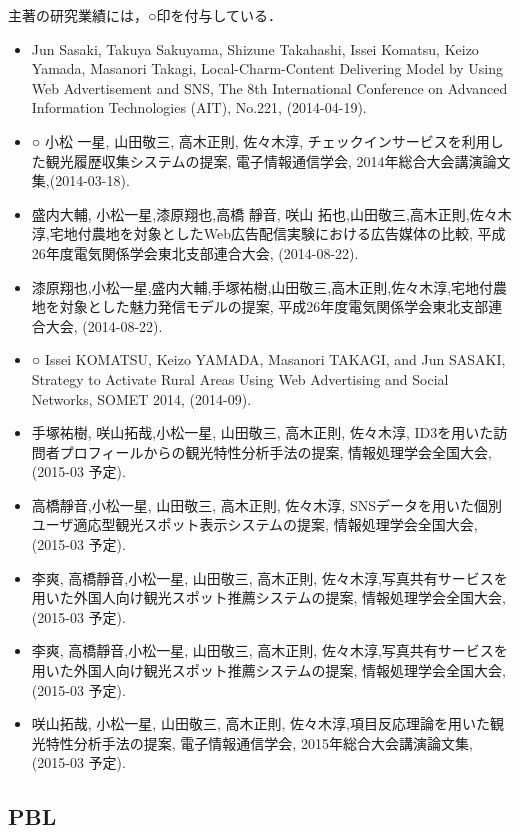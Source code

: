 \documentclass{jsarticle}
\begin{document}
主著の研究業績には，○印を付与している．

\begin{itemize}
\item Jun Sasaki, Takuya Sakuyama, Shizune Takahashi, Issei Komatsu, Keizo Yamada, Masanori Takagi, Local-Charm-Content Delivering Model by Using Web Advertisement and SNS, The 8th International Conference on Advanced Information Technologies (AIT), No.221, (2014-04-19).
\item ○ 小松 一星, 山田敬三, 高木正則, 佐々木淳, チェックインサービスを利用した観光履歴収集システムの提案, 電子情報通信学会, 2014年総合大会講演論文集,(2014-03-18).
\item 盛内大輔, 小松一星,漆原翔也,高橋 靜音, 咲山 拓也,山田敬三,高木正則,佐々木淳,宅地付農地を対象としたWeb広告配信実験における広告媒体の比較, 平成26年度電気関係学会東北支部連合大会, (2014-08-22).
\item 漆原翔也,小松一星,盛内大輔,手塚祐樹,山田敬三,高木正則,佐々木淳,宅地付農地を対象とした魅力発信モデルの提案, 平成26年度電気関係学会東北支部連合大会, (2014-08-22).
\item ○ Issei KOMATSU, Keizo YAMADA, Masanori TAKAGI,  and Jun SASAKI, Strategy to Activate Rural Areas Using Web Advertising and Social Networks, SOMET 2014, (2014-09).
\item 手塚祐樹, 咲山拓哉,小松一星, 山田敬三, 高木正則, 佐々木淳, ID3を用いた訪問者プロフィールからの観光特性分析手法の提案, 情報処理学会全国大会, (2015-03 予定).
\item 高橋靜音,小松一星, 山田敬三, 高木正則, 佐々木淳, SNSデータを用いた個別ユーザ適応型観光スポット表示システムの提案, 情報処理学会全国大会, (2015-03 予定).
\item 李爽, 高橋靜音,小松一星, 山田敬三, 高木正則, 佐々木淳,写真共有サービスを用いた外国人向け観光スポット推薦システムの提案, 情報処理学会全国大会, (2015-03 予定).
\item 李爽, 高橋靜音,小松一星, 山田敬三, 高木正則, 佐々木淳,写真共有サービスを用いた外国人向け観光スポット推薦システムの提案, 情報処理学会全国大会, (2015-03 予定).
\item 咲山拓哉, 小松一星, 山田敬三, 高木正則, 佐々木淳,項目反応理論を用いた観光特性分析手法の提案, 電子情報通信学会, 2015年総合大会講演論文集, (2015-03 予定).
\end{itemize}

\subsection*{PBL}
\end{document}
